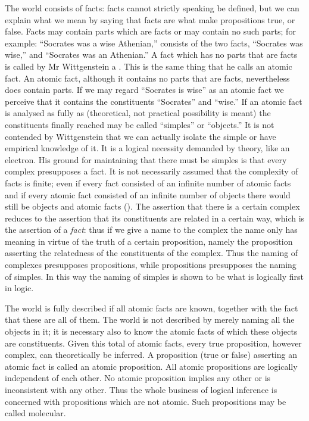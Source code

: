 The world consists of facts: facts cannot strictly
speaking be defined, but we can explain what we mean
by saying that facts are what make propositions true, or
false. Facts may contain parts which are facts or may
contain no such parts; for example: ``Socrates was a wise
Athenian,'' consists of the two facts, ``Socrates was wise,''
and ``Socrates was an Athenian.'' A fact which has no
parts that are facts is called by Mr Wittgenstein a .
This is the same thing that he calls an atomic fact.
An atomic fact, although it contains no parts that are
facts, nevertheless does contain parts. If we may regard
``Socrates is wise'' as an atomic fact we perceive that it
contains the constituents ``Socrates'' and ``wise.'' If an
atomic fact is analysed as fully as  (theoretical,
not practical possibility is meant) the constituents finally
reached may be called ``simples'' or ``objects.'' It is not
contended by Wittgenstein that we can actually isolate
the simple or have empirical knowledge of it. It is a
logical necessity demanded by theory, like an electron.
His ground for maintaining that there must be simples
is that every complex presupposes a fact. It is not
necessarily assumed that the complexity of facts is finite;
even if every fact consisted of an infinite number of atomic
facts and if every atomic fact consisted of an infinite
number of objects there would still be objects and atomic
facts (). The assertion that there is a certain
complex reduces to the assertion that its constituents
are related in a certain way, which is the assertion of
a \emph{fact}: thus if we give a name to the complex the name
only has meaning in virtue of the truth of a certain
proposition, namely the proposition asserting the relatedness
of the constituents of the complex. Thus the naming
of complexes presupposes propositions, while propositions
presupposes the naming of simples. In this way the
naming of simples is shown to be what is logically first
in logic.

The world is fully described if all atomic facts are
known, together with the fact that these are all of them.
The world is not described by merely naming all the
objects in it; it is necessary also to know the atomic facts
of which these objects are constituents. Given this total
of atomic facts, every true proposition, however complex,
can theoretically be inferred. A proposition (true or
false) asserting an atomic fact is called an atomic proposition.
All atomic propositions are logically independent
of each other. No atomic proposition implies any other
or is inconsistent with any other. Thus the whole business
of logical inference is concerned with propositions which
are not atomic. Such propositions may be called
molecular.

